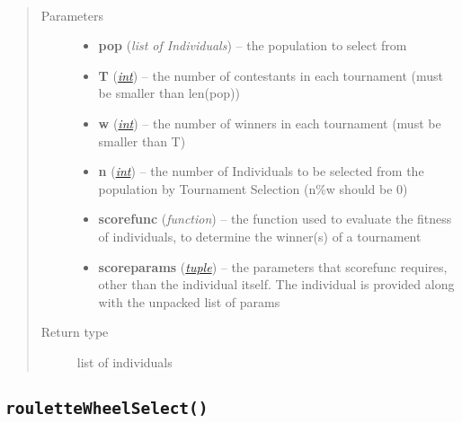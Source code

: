 \documentclass[letterpaper,10pt,english]{sphinxmanual}
\begin{document}
\begin{fulllineitems}
\label{Overview:tournamentSelect}~\begin{quote}\begin{description}
\item[{Parameters}] \leavevmode\begin{itemize}
\item {} 
\textbf{pop} (\emph{list of Individuals}) -- the population to select from

\item {} 
\textbf{T} (\href{http://docs.python.org/library/functions.html\#int}{\emph{int}}) -- the number of contestants in each tournament (must be smaller than len(pop))

\item {} 
\textbf{w} (\href{http://docs.python.org/library/functions.html\#int}{\emph{int}}) -- the number of winners in each tournament (must be smaller than T)

\item {} 
\textbf{n} (\href{http://docs.python.org/library/functions.html\#int}{\emph{int}}) -- the number of Individuals to be selected from the population by Tournament Selection (n\%w should be 0)

\item {} 
\textbf{scorefunc} (\emph{function}) -- the function used to evaluate the fitness of individuals, to determine the winner(s) of a tournament

\item {} 
\textbf{scoreparams} (\href{http://docs.python.org/library/functions.html\#tuple}{\emph{tuple}}) -- the parameters that scorefunc requires, other than the individual itself. The individual is provided along with the unpacked list of params

\end{itemize}

\item[{Return type}] \leavevmode
list of individuals

\end{description}\end{quote}

\end{fulllineitems}



\subsection{\texttt{rouletteWheelSelect()}}
\label{Overview:roulettewheelselect}
\end{document}
